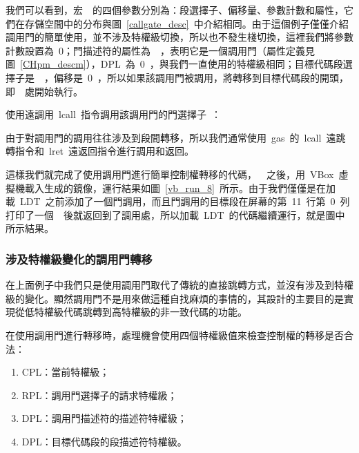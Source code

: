 我們可以看到，宏~~的四個參數分別為：段選擇子、偏移量、參數計數和屬性，它們在存儲空間中的分布與圖~\ref{callgate_desc}~中介紹相同。由于這個例子僅僅介紹調用門的簡單使用，並不涉及特權級切換，所以也不發生棧切換，這裡我們將參數計數設置為~0；門描述符的屬性為~~，表明它是一個調用門（屬性定義見圖~\ref{CHpm_descm}），DPL~為~0~，與我們一直使用的特權級相同；目標代碼段選擇子是~~，偏移是~0~，所以如果該調用門被調用，將轉移到目標代碼段的開頭，即~~處開始執行。

使用遠調用~lcall~指令調用該調用門的門選擇子~：

\label{CHpm_cg_call1}

由于對調用門的調用往往涉及到段間轉移，所以我們通常使用~gas~的~lcall~遠跳轉指令和~lret~遠返回指令進行調用和返回。

這樣我們就完成了使用調用門進行簡單控制權轉移的代碼，~~之後，用~VBox~虛擬機載入生成的鏡像，運行結果如圖~\ref{vb_run_8}~所示。由于我們僅僅是在加載~LDT~之前添加了一個門調用，而且門調用的目標段在屏幕的第~11~行第~0~列打印了一個~~後就返回到了調用處，所以加載~LDT~的代碼繼續運行，就是圖中所示結果。


\subsubsection{涉及特權級變化的調用門轉移}

在上面例子中我們只是使用調用門取代了傳統的直接跳轉方式，並沒有涉及到特權級的變化。顯然調用門不是用來做這種自找麻煩的事情的，其設計的主要目的是實現從低特權級代碼跳轉到高特權級的非一致代碼的功能。

在使用調用門進行轉移時，處理機會使用四個特權級值來檢查控制權的轉移是否合法：

\begin{enumerate}
\item CPL：當前特權級；
\item RPL：調用門選擇子的請求特權級；
\item DPL：調用門描述符的描述符特權級；
\item DPL：目標代碼段的段描述符特權級。
\end{enumerate}

